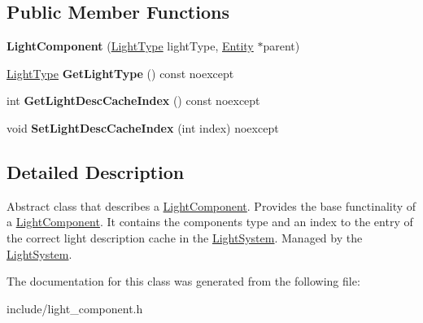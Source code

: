 \subsection*{Public Member Functions}
\begin{DoxyCompactItemize}
\item 
\mbox{\label{class_blade_1_1_light_component_a3dca07977eb7dd2edefebdf6e4cd2da7}} 
{\bfseries Light\+Component} (\hyperlink{namespace_blade_ab0c52aa137a4f43360f7440da56e6b03}{Light\+Type} light\+Type, \hyperlink{class_blade_1_1_entity}{Entity} $\ast$parent)
\item 
\mbox{\label{class_blade_1_1_light_component_a1c4113d0e1c0c71501b5e861c46b2eca}} 
\hyperlink{namespace_blade_ab0c52aa137a4f43360f7440da56e6b03}{Light\+Type} {\bfseries Get\+Light\+Type} () const noexcept
\item 
\mbox{\label{class_blade_1_1_light_component_af6e1c1a417285c8cbef03d6182e8e91c}} 
int {\bfseries Get\+Light\+Desc\+Cache\+Index} () const noexcept
\item 
\mbox{\label{class_blade_1_1_light_component_ab2286335bc867d2f8b98a53cd7ec2123}} 
void {\bfseries Set\+Light\+Desc\+Cache\+Index} (int index) noexcept
\end{DoxyCompactItemize}


\subsection{Detailed Description}
Abstract class that describes a \hyperlink{class_blade_1_1_light_component}{Light\+Component}. Provides the base functinality of a \hyperlink{class_blade_1_1_light_component}{Light\+Component}. It contains the component\textquotesingle{}s type and an index to the entry of the correct light description cache in the \hyperlink{class_blade_1_1_light_system}{Light\+System}. Managed by the \hyperlink{class_blade_1_1_light_system}{Light\+System}. 

The documentation for this class was generated from the following file\+:\begin{DoxyCompactItemize}
\item 
include/light\+\_\+component.\+h\end{DoxyCompactItemize}
